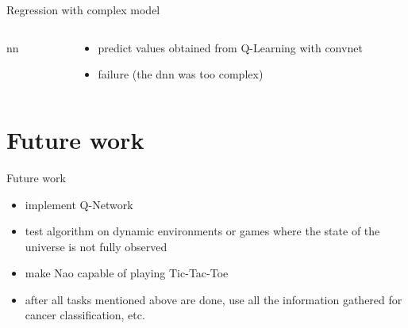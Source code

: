 \documentclass{beamer}
\begin{document}
\begin{frame}{Regression with complex model}
	
	\begin{columns}[T]
\begin{column}{0.64\textwidth}
nn
\end{column}
\begin{column}{0.34\textwidth}
\begin{itemize}
		\item predict values obtained from Q-Learning with convnet
		\item failure (the dnn was too complex)
	\end{itemize}
\end{column}
\end{columns}
\end{frame}

\section{Future work}
\begin{frame}{Future work}
	\begin{itemize}
		\item implement Q-Network
		\item test algorithm on dynamic environments or games where the state of the universe is not fully observed
		\item make Nao capable of playing Tic-Tac-Toe
		\item after all tasks mentioned above are done, use all the information gathered for cancer classification, etc.
	\end{itemize}
\end{frame}

\end{document}

